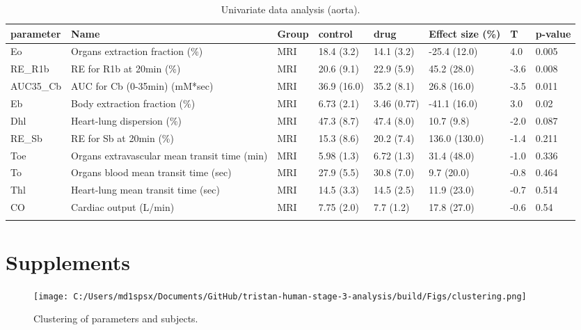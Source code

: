 \documentclass{epflreport}%
\begin{document}
\clearpage%
\begin{longtable}{|p{1.5cm}|p{1.5cm}|p{1.5cm}|p{1.5cm}|p{1.5cm}|p{1.5cm}|p{1.5cm}|p{1.5cm}|}%
\hline%
parameter&Name&Group&control&drug&Effect size (\%)&T&p{-}value\\%
\hline%
Eo&Organs extraction fraction (\%)&MRI&18.4 (3.2) &14.1 (3.2) &{-}25.4 (12.0) &4.0&0.005\\%
RE\_R1b&RE for R1b at 20min (\%)&MRI&20.6 (9.1) &22.9 (5.9) &45.2 (28.0) &{-}3.6&0.008\\%
AUC35\_Cb&AUC for Cb (0{-}35min) (mM*sec)&MRI&36.9 (16.0) &35.2 (8.1) &26.8 (16.0) &{-}3.5&0.011\\%
Eb&Body extraction fraction (\%)&MRI&6.73 (2.1) &3.46 (0.77) &{-}41.1 (16.0) &3.0&0.02\\%
Dhl&Heart{-}lung dispersion (\%)&MRI&47.3 (8.7) &47.4 (8.0) &10.7 (9.8) &{-}2.0&0.087\\%
RE\_Sb&RE for Sb at 20min (\%)&MRI&15.3 (8.6) &20.2 (7.4) &136.0 (130.0) &{-}1.4&0.211\\%
Toe&Organs extravascular mean transit time (min)&MRI&5.98 (1.3) &6.72 (1.3) &31.4 (48.0) &{-}1.0&0.336\\%
To&Organs blood mean transit time (sec)&MRI&27.9 (5.5) &30.8 (7.0) &9.7 (20.0) &{-}0.8&0.464\\%
Thl&Heart{-}lung mean transit time (sec)&MRI&14.5 (3.3) &14.5 (2.5) &11.9 (23.0) &{-}0.7&0.514\\%
CO&Cardiac output (L/min)&MRI&7.75 (2.0) &7.7 (1.2) &17.8 (27.0) &{-}0.6&0.54\\%
\hline%
\caption{Univariate data analysis (aorta).} \\%
\end{longtable}%
\clearpage%
\chapter{Supplements}%
\clearpage%


\begin{figure}[h!]%
\centering%
\texttt{[image: C:/Users/md1spsx/Documents/GitHub/tristan-human-stage-3-analysis/build/Figs/clustering.png]}%
\caption{Clustering of parameters and subjects.}%
\end{figure}

%
\end{document}
